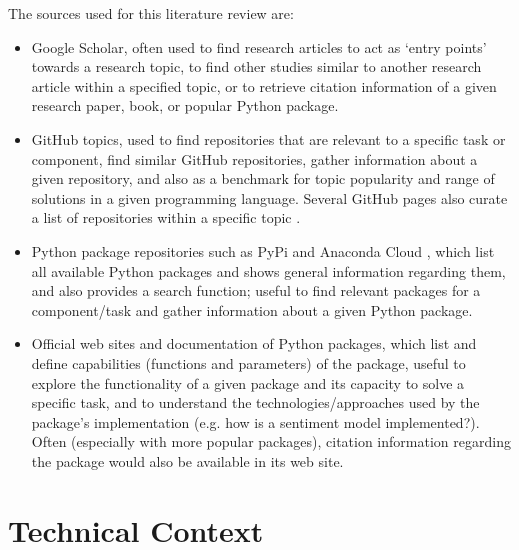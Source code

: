 \documentclass{report}
\begin{document}
The sources used for this literature review are:
\begin{itemize}
	\item Google Scholar, often used to find research articles to act as `entry points' towards a research topic, to find other studies similar to another research article within a specified topic, or to retrieve citation information of a given research paper, book, or popular Python package.
	\item GitHub topics, used to find repositories that are relevant to a specific task or component, find similar GitHub repositories, gather information about a given repository, and also as a benchmark for topic popularity and range of solutions in a given programming language.
		Several GitHub pages also curate a list of repositories within a specific topic \cite{awesome-sentiment-analysis, awesome-nlp, awesome-machine-learning}.
	\item Python package repositories such as PyPi \cite{PyPi} and Anaconda Cloud \cite{Anaconda-Cloud}, which list all available Python packages and shows general information regarding them, and also provides a search function; useful to find relevant packages for a component/task and gather information about a given Python package.
	\item Official web sites and documentation of Python packages, which list and define capabilities (functions and parameters) of the package, useful to explore the functionality of a given package and its capacity to solve a specific task, and to understand the technologies/approaches used by the package's implementation (e.g. how is a sentiment model implemented?). 
		Often (especially with more popular packages), citation information regarding the package would also be available in its web site.
\end{itemize}

\section{Technical Context} \label{Technical Context}  %
\end{document}
